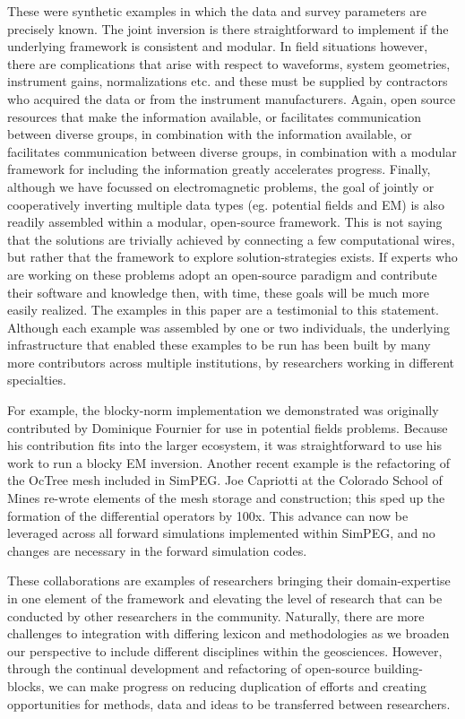 \documentclass[paper]{geophysics}
\begin{document}
These were synthetic examples in which the data and survey parameters are precisely known. The joint inversion is there straightforward to implement if the underlying framework is consistent and modular. In field situations however, there are complications that arise with respect to waveforms, system geometries, instrument gains, normalizations etc. and these must be supplied by contractors who acquired the data or from the instrument manufacturers. Again, open source resources that make the information available, or facilitates communication between diverse groups, in combination with
the information available, or facilitates communication between diverse groups, in combination with a modular framework for including the information greatly accelerates progress. Finally, although we have focussed on electromagnetic problems, the goal of jointly or cooperatively inverting multiple data types (eg. potential fields and EM) is also readily assembled within a modular, open-source framework. This is not saying that the solutions are trivially achieved by connecting a few computational wires, but rather that the framework to explore solution-strategies exists. If experts who are working on these problems adopt an open-source paradigm and contribute their software and knowledge then, with time, these goals will be much more easily realized. The examples in this paper are a testimonial to this statement. Although each example was assembled by one or two individuals, the underlying infrastructure that enabled these examples to be run has been built by many more contributors across multiple institutions, by researchers working in different specialties.

For example, the blocky-norm implementation we demonstrated was originally contributed by Dominique Fournier for use in potential fields problems. Because his contribution fits into the larger ecosystem, it was straightforward to use his work to run a blocky EM inversion. Another recent example is the refactoring of the OcTree mesh included in SimPEG. Joe Capriotti at the Colorado School of Mines re-wrote elements of the mesh storage and construction; this sped up the formation of the differential operators by 100x. This advance can now be leveraged across all forward simulations implemented within SimPEG, and no changes are necessary in the forward simulation codes.

These collaborations are examples of researchers bringing their domain-expertise in one element of the framework and elevating the level of research that can be conducted by other researchers in the community. Naturally, there are more challenges to integration with differing lexicon and methodologies as we broaden our perspective to include different disciplines within the geosciences. However, through the continual development and refactoring of open-source building-blocks, we can make progress on reducing duplication of efforts and creating opportunities for methods, data and ideas to be transferred between researchers.
\end{document}
